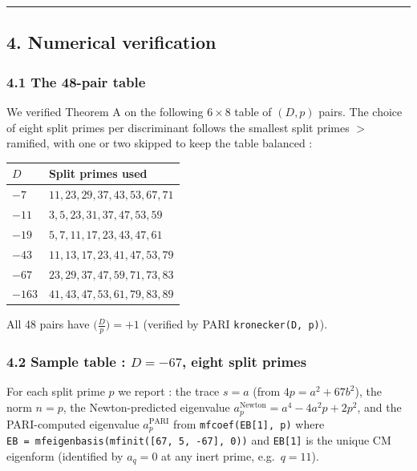 \documentclass[
  11pt,
  a4paper,
]{amsart}
\begin{document}
\begin{center}\rule{0.5\linewidth}{0.5pt}\end{center}

\hypertarget{numerical-verification}{%
\subsection{4. Numerical verification}\label{numerical-verification}}

\hypertarget{the-48-pair-table}{%
\subsubsection{4.1 The 48-pair table}\label{the-48-pair-table}}

We verified Theorem A on the following \(6 \times 8\) table of \((D, p)\) pairs. The choice of eight split primes per discriminant follows the smallest split primes \(>\) ramified, with one or two skipped to keep the table balanced :

\begin{longtable}[]{@{}ll@{}}
\toprule\noalign{}
\(D\) & Split primes used \\
\midrule\noalign{}
\endhead
\bottomrule\noalign{}
\endlastfoot
\(-7\) & \(11, 23, 29, 37, 43, 53, 67, 71\) \\
\(-11\) & \(3, 5, 23, 31, 37, 47, 53, 59\) \\
\(-19\) & \(5, 7, 11, 17, 23, 43, 47, 61\) \\
\(-43\) & \(11, 13, 17, 23, 41, 47, 53, 79\) \\
\(-67\) & \(23, 29, 37, 47, 59, 71, 73, 83\) \\
\(-163\) & \(41, 43, 47, 53, 61, 79, 83, 89\) \\
\end{longtable}

All 48 pairs have \(\bigl(\tfrac{D}{p}\bigr) = +1\) (verified by PARI \texttt{kronecker(D,\ p)}).

\hypertarget{sample-table-d--67-eight-split-primes}{%
\subsubsection{\texorpdfstring{4.2 Sample table : \(D = -67\), eight split primes}{4.2 Sample table : D = -67, eight split primes}}\label{sample-table-d--67-eight-split-primes}}

For each split prime \(p\) we report : the trace \(s = a\) (from \(4p = a^2 + 67 b^2\)), the norm \(n = p\), the Newton-predicted eigenvalue \(a_p^{\mathrm{Newton}} = a^4 - 4 a^2 p + 2 p^2\), and the PARI-computed eigenvalue \(a_p^{\mathrm{PARI}}\) from \texttt{mfcoef(EB{[}1{]},\ p)} where \texttt{EB\ =\ mfeigenbasis(mfinit({[}67,\ 5,\ -67{]},\ 0))} and \texttt{EB{[}1{]}} is the unique CM eigenform (identified by \(a_q = 0\) at any inert prime, e.g.~\(q = 11\)).
\end{document}
